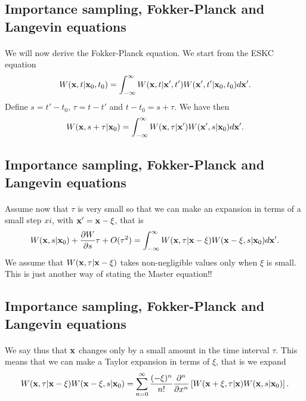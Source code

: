 \documentclass[%
twoside,                 %
final,                   %
10pt]{article}
\begin{document}
{{{{{{%
\subsection{Importance sampling, Fokker-Planck and Langevin equations}

\paragraph{}
We will now derive the Fokker-Planck equation. 
We start from the ESKC equation
\[
 W({\bf x},t|{\bf x}_0,t_0)  = \int_{-\infty}^{\infty} W({\bf x},t|{\bf x}',t')W({\bf x}',t'|{\bf x}_0,t_0)d{\bf x}'.
\]
Define $s=t'-t_0$, $\tau=t-t'$ and $t-t_0=s+\tau$. We have then
\[
 W({\bf x},s+\tau|{\bf x}_0)  = \int_{-\infty}^{\infty} W({\bf x},\tau|{\bf x}')W({\bf x}',s|{\bf x}_0)d{\bf x}'.
\]




\subsection{Importance sampling, Fokker-Planck and Langevin equations}

\paragraph{}
Assume now that $\tau$ is very small so that we can make an expansion in terms of a small step $xi$, with ${\bf x}'={\bf x}-\xi$, that is
\[
 W({\bf x},s|{\bf x}_0)+\frac{\partial W}{\partial s}\tau +O(\tau^2) = \int_{-\infty}^{\infty} W({\bf x},\tau|{\bf x}-\xi)W({\bf x}-\xi,s|{\bf x}_0)d{\bf x}'.
\]
We assume that $W({\bf x},\tau|{\bf x}-\xi)$ takes non-negligible values only when $\xi$ is small. This is just another way of stating the Master equation!!




\subsection{Importance sampling, Fokker-Planck and Langevin equations}

\paragraph{}
We say thus that ${\bf x}$ changes only by a small amount in the time interval $\tau$. 
This means that we can make a Taylor expansion in terms of $\xi$, that is we
expand
\[
W({\bf x},\tau|{\bf x}-\xi)W({\bf x}-\xi,s|{\bf x}_0) =
\sum_{n=0}^{\infty}\frac{(-\xi)^n}{n!}\frac{\partial^n}{\partial x^n}\left[W({\bf x}+\xi,\tau|{\bf x})W({\bf x},s|{\bf x}_0)
\right].
\]




}}}}}}
\end{document}
